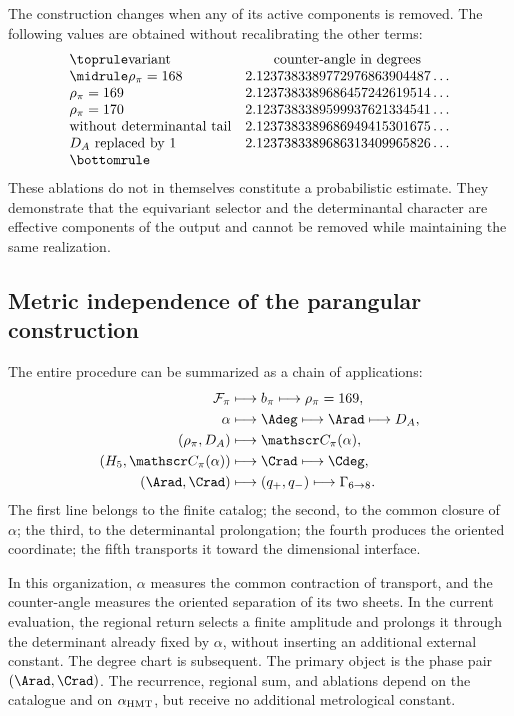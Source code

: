 The construction changes when any of its active components is removed.
The following values are obtained without recalibrating the other terms:
\[
\begin{array}{@{}lc@{}}
\toprule
\text{variant}&\text{counter-angle in degrees}\\
\midrule
\rho_\pi=168&2.1237383389772976863904487\ldots\\
\rho_\pi=169&2.1237383389686457242619514\ldots\\
\rho_\pi=170&2.1237383389599937621334541\ldots\\
\text{without determinantal tail}&2.1237383389686949415301675\ldots\\
D_A\text{ replaced by }1&2.1237383389686313409965826\ldots\\
\bottomrule
\end{array}
\]
These ablations do not in themselves constitute a probabilistic estimate.
They demonstrate that the equivariant selector and the determinantal character are
effective components of the output and cannot be removed while maintaining the
same realization.

\subsection{Metric independence of the parangular construction}
\label{sec:s102:c38:7:6}


The entire procedure can be summarized as a chain of applications:
\[
\begin{aligned}
\mathcal F_\pi
&\longmapsto b_\pi
\longmapsto\rho_\pi=169,\\
\alpha
&\longmapsto \Adeg
\longmapsto \Arad
\longmapsto D_A,\\
(\rho_\pi,D_A)
&\longmapsto\mathscr C_\pi(\alpha),\\
(H_5,\mathscr C_\pi(\alpha))
&\longmapsto \Crad
\longmapsto \Cdeg,\\
(\Arad,\Crad)
&\longmapsto(q_+,q_-)
\longmapsto\Gamma_{6\to8}.
\end{aligned}
\]
The first line belongs to the finite catalog; the second, to the common closure of
\(\alpha\); the third, to the determinantal prolongation; the fourth produces the
oriented coordinate; the fifth transports it toward the dimensional interface.

In this organization, \(\alpha\) measures the common contraction of transport, and
the counter-angle measures the oriented separation of its two sheets. In the
current evaluation, the regional return selects a finite amplitude and
prolongs it through the determinant already fixed by \(\alpha\), without inserting an
additional external constant. The degree chart is subsequent. The primary
object is the phase pair \((\Arad,\Crad)\). The recurrence, regional sum,
and ablations depend on the catalogue and on
\(\alpha_{\rm HMT}\), but receive no additional metrological constant.


